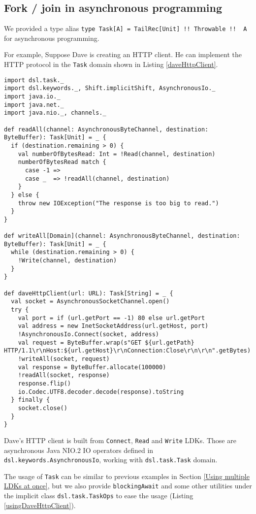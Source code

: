 \subsection{Fork / join in asynchronous programming}

We provided a type alias \lstinline{type Task[A] = TailRec[Unit] !! Throwable !!  A} for asynchronous programming.

For example, Suppose Dave is creating an HTTP client. He can implement the HTTP protocol in the \lstinline{Task} domain shown in Listing \ref{daveHttpClient}.

\begin{lstlisting}[caption={Dave's HTTP client},label={daveHttpClient}]
import dsl.task._
import dsl.keywords._, Shift.implicitShift, AsynchronousIo._
import java.io._
import java.net._
import java.nio._, channels._

def readAll(channel: AsynchronousByteChannel, destination: ByteBuffer): Task[Unit] = _ {
  if (destination.remaining > 0) {
    val numberOfBytesRead: Int = !Read(channel, destination)
    numberOfBytesRead match {
      case -1 =>
      case _  => !readAll(channel, destination)
    }
  } else {
    throw new IOException("The response is too big to read.")
  }
}

def writeAll[Domain](channel: AsynchronousByteChannel, destination: ByteBuffer): Task[Unit] = _ {
  while (destination.remaining > 0) {
    !Write(channel, destination)
  }
}

def daveHttpClient(url: URL): Task[String] = _ {
  val socket = AsynchronousSocketChannel.open()
  try {
    val port = if (url.getPort == -1) 80 else url.getPort
    val address = new InetSocketAddress(url.getHost, port)
    !AsynchronousIo.Connect(socket, address)
    val request = ByteBuffer.wrap(s"GET ${url.getPath} HTTP/1.1\r\nHost:${url.getHost}\r\nConnection:Close\r\n\r\n".getBytes)
    !writeAll(socket, request)
    val response = ByteBuffer.allocate(100000)
    !readAll(socket, response)
    response.flip()
    io.Codec.UTF8.decoder.decode(response).toString
  } finally {
    socket.close()
  }
}
\end{lstlisting}

Dave's HTTP client is built from \lstinline{Connect}, \lstinline{Read} and \lstinline{Write} LDKs. Those are asynchronous Java NIO.2 IO operators defined in \lstinline{dsl.keywords.AsynchronousIo}, working with \lstinline{dsl.task.Task} domain.

The usage of \lstinline{Task} can be similar to previous examples in Section \ref{Using multiple LDKs at once}, but we also provide \lstinline{blockingAwait} and some other utilities under the implicit class \lstinline{dsl.task.TaskOps} to ease the usage (Listing \ref{usingDaveHttpClient}).

